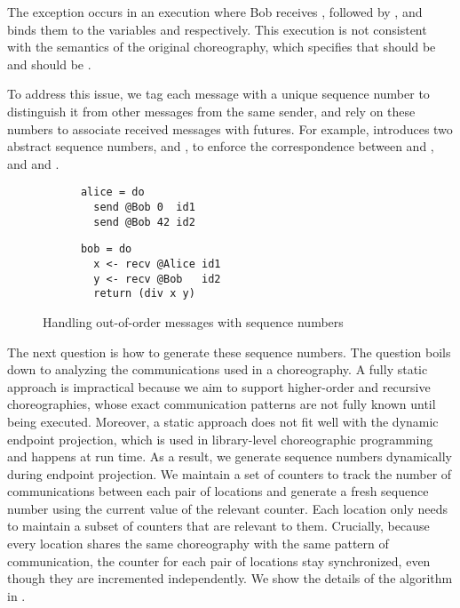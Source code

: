 \noindent The exception occurs in an execution where Bob receives , followed by , and binds them to the variables  and  respectively.
%
This execution is not consistent with the semantics of the original choreography, which specifies that  should be  and  should be .

To address this issue, we tag each message with a unique sequence number to distinguish it from other messages from the same sender, and rely on these numbers to associate received messages with futures.
%
For example,  introduces two abstract sequence numbers,  and , to enforce the correspondence between  and , and  and .

\begin{figure}[h]
  \begin{minipage}[t]{.45\textwidth}
    \begin{verbatim}
      alice = do
        send @Bob 0  id1
        send @Bob 42 id2
    \end{verbatim}      
  \end{minipage}
  \begin{minipage}[t]{.45\textwidth}
    \begin{verbatim}
      bob = do
        x <- recv @Alice id1
        y <- recv @Bob   id2
        return (div x y)
    \end{verbatim}
  \end{minipage}
  \caption{Handling out-of-order messages with sequence numbers}
  \label{fig:challenge-net}
\end{figure}

The next question is how to generate these sequence numbers. 
%
The question boils down to analyzing the communications used in a choreography.
%
A fully static approach is impractical because we aim to support higher-order and recursive choreographies, whose exact communication patterns are not fully known until being executed.
%
Moreover, a static approach does not fit well with the dynamic endpoint projection, which is used in library-level choreographic programming and happens at run time.
%
As a result, we generate sequence numbers dynamically during endpoint projection.
%
We maintain a set of counters to track the number of communications between each pair of locations and generate a fresh sequence number using the current value of the relevant counter.
%
Each location only needs to maintain a subset of counters that are relevant to them.
%
Crucially, because every location shares the same choreography with the same pattern of communication, the counter for each pair of locations stay synchronized, even though they are incremented independently.
%
We show the details of the algorithm in .